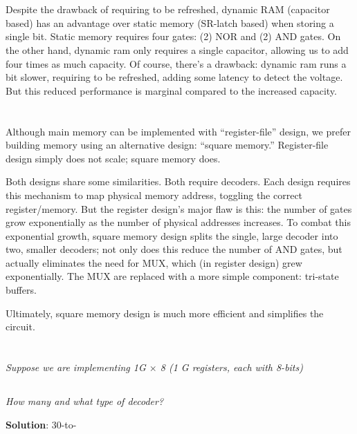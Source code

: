 \documentclass{article}
\begin{document}
\section{}
Despite the drawback of requiring to be refreshed, dynamic RAM (capacitor based) has an advantage over static memory (SR-latch based) when storing a single bit. Static memory requires four gates: (2) NOR and (2) AND gates. On the other hand, dynamic ram only requires a single capacitor, allowing us to add four times as much capacity. Of course, there's a drawback: dynamic ram runs a bit slower, requiring to be refreshed, adding some latency to detect the voltage. But this reduced performance is marginal compared to the increased capacity.

\section{}

Although main memory can be implemented with ``register-file'' design, we prefer building memory using an alternative design: ``square memory.'' Register-file design simply does not scale; square memory does.

Both designs share some similarities. Both require decoders. Each design requires this mechanism to map physical memory address, toggling the correct register/memory. But the register design's major flaw is this: the number of gates grow exponentially as the number of physical addresses increases. To combat this exponential growth, square memory design splits the single, large decoder into two, smaller decoders; not only does this reduce the number of AND gates, but actually eliminates the need for MUX, which (in register design) grew exponentially. The MUX are replaced with a more simple component: tri-state buffers.

Ultimately, square memory design is much more efficient and simplifies the circuit.


\section{}
\textit{Suppose we are implementing 1G $\times$ 8 (1 G registers, each with 8-bits)}

\subsection{}
\textit{How many and what type of decoder?}

\textbf{Solution}: 30-to-
\end{document}
